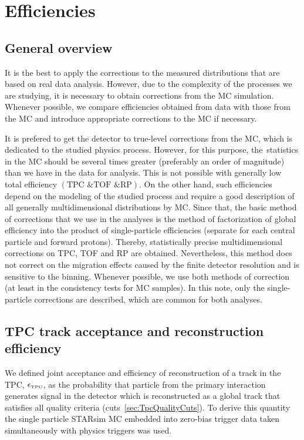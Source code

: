 

\chapter{Efficiencies}\label{chap:efficiencies}
\section{General overview}\label{sec:effGeneralOverview}
It is the best to apply the corrections to the measured distributions  that are based on real data analysis. However, due to the complexity of the processes we are studying, it is necessary to obtain corrections from the MC simulation. Whenever possible, we compare efficiencies obtained from data with those from the MC and introduce appropriate corrections to the MC if necessary.

It is prefered to get the detector to true-level corrections from the MC, which is dedicated to the studied physics process. However, for this purpose, the~statistics in the MC should be several times greater (preferably an order of magnitude) than we have in the data for analysis. This is not possible with generally low total efficiency $\left(\textrm{TPC \& TOF \& RP}\right)$. On the other hand, such efficiencies depend on the modeling of the studied process and require a good description of all generally multidimensional distributions  by MC. Since that, the basic method of corrections that we use in the analyses is the method of factorization of global efficiency into the product of single-particle efficiencies (separate for each central particle and forward protons). Thereby,  statistically precise multidimensional corrections on TPC, TOF and RP are obtained. Nevertheless, this method does not correct on the migration effects caused by the finite detector resolution and is sensitive to the binning. Whenever possible, we use both methods of correction (at least in the consistency tests for MC samples). In this note, only the single-particle corrections are described, which are common for both analyses.

\section{TPC track acceptance and reconstruction efficiency}\label{sec:tpcAccAndEff}
We defined joint acceptance and efficiency of reconstruction of a track in the TPC, $\epsilon_{\textrm{\tiny TPC}}$, as the probability that particle from the primary interaction generates signal in the detector which is reconstructed as a global track that satisfies all quality criteria (cuts~\ref{sec:TpcQualityCuts}).
To derive this quantity the single particle STARsim MC embedded into zero-bias trigger data taken simultaneously with physics triggers 
 was used.
